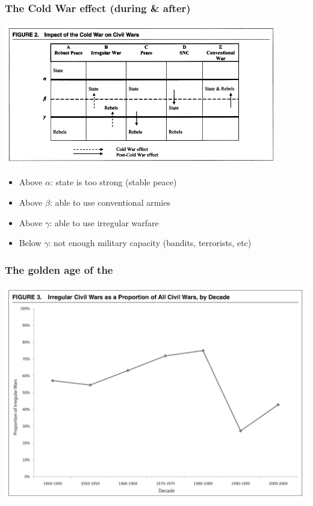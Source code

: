 \documentclass[aspectratio=43]{beamer}
\begin{document}
\begin{frame}
\frametitle{The Cold War effect (during \& after)}
\centering

\includegraphics[width = 0.9\textwidth]{img/kalyvas_balcells_cold_war}

\begin{itemize}
  \item Above $\alpha$: state is too strong (stable peace)
  \item Above $\beta$: able to use conventional armies
  \item Above $\gamma$: able to use irregular warfare
  \item Below $\gamma$: not enough military capacity (bandits, terrorists, etc)
\end{itemize}

\end{frame}

\begin{frame}
\frametitle{The golden age of the }
\centering

\includegraphics[width = \textwidth]{img/kalyvas_balcells_irr}

\end{frame}
\end{document}
